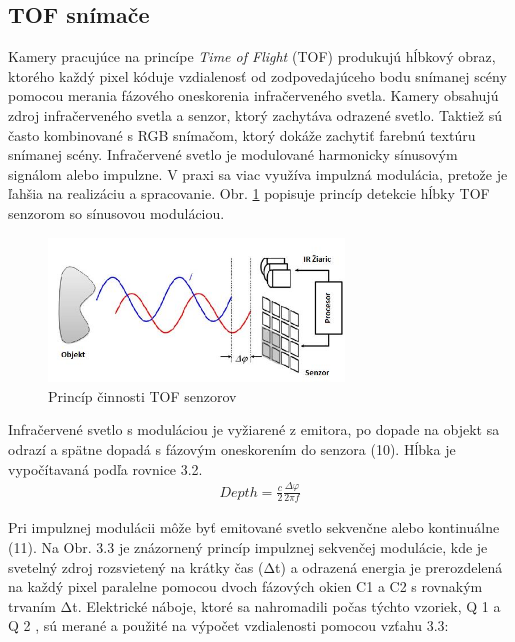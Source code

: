 \subsection{TOF snímače}
\label{sec:tof}
Kamery pracujúce na princípe \textit{Time of Flight} (TOF) produkujú hĺbkový obraz, ktorého každý pixel kóduje vzdialenosť od zodpovedajúceho bodu snímanej scény pomocou merania fázového oneskorenia infračerveného svetla. Kamery obsahujú zdroj infračerveného svetla a senzor, ktorý zachytáva odrazené svetlo. Taktiež sú často kombinované s RGB snímačom, ktorý dokáže zachytiť farebnú textúru snímanej scény. Infračervené svetlo je modulované harmonicky sínusovým signálom alebo impulzne. V praxi sa viac využíva impulzná modulácia, pretože je ľahšia na realizáciu a spracovanie. Obr. \ref{fig:tof_principle} popisuje princíp detekcie hĺbky TOF senzorom so sínusovou moduláciou.

\begin{figure}[h]
	\centering
	\includegraphics[width=0.7\textwidth]{figures/tof_principle.png} 
	\caption{Princíp činnosti TOF senzorov}
	\label{fig:tof_principle}
\end{figure}

Infračervené svetlo s moduláciou je vyžiarené z emitora, po dopade na objekt sa odrazí a spätne dopadá s fázovým oneskorením do senzora (10). Hĺbka je vypočítavaná podľa rovnice 3.2.
\begin{equation}
\label{eq2}
\begin{aligned}
Depth=\frac{c}{2}\frac{\Delta \varphi}{2 \pi f}
\end{aligned}
\end{equation}

Pri impulznej modulácii môže byť emitované svetlo sekvenčne alebo kontinuálne (11). Na Obr. 3.3 je znázornený princíp impulznej sekvenčej modulácie, kde je svetelný zdroj rozsvietený na krátky čas (Δt) a odrazená energia je prerozdelená na každý pixel paralelne pomocou dvoch fázových okien C1 a C2 s rovnakým trvaním Δt. Elektrické náboje, ktoré sa nahromadili počas týchto vzoriek, Q 1 a Q 2 , sú merané a použité na výpočet vzdialenosti pomocou vzťahu 3.3:

